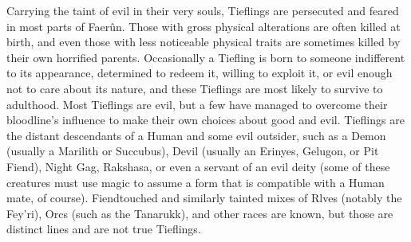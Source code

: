 
Carrying the taint of evil in their very souls, Tieflings are persecuted and feared in most parts of Faerûn. Those with gross physical alterations are often killed at birth, and even those with less noticeable physical traits are sometimes killed by their own horrified parents. Occasionally a Tiefling is born to someone indifferent to its appearance, determined to redeem it, willing to exploit it, or evil enough not to care about its nature, and these Tieflings are most likely to survive to adulthood. Most Tieflings are evil, but a few have managed to overcome their bloodline’s influence to make their own choices about good and evil. Tieflings are the distant descendants of a Human and some evil outsider, such as a Demon (usually a Marilith or Succubus), Devil (usually an Erinyes, Gelugon, or Pit Fiend), Night Gag, Rakshasa, or even a servant of an evil deity (some of these creatures must use magic to assume a form that is compatible with a Human mate, of course). Fiendtouched and similarly tainted mixes of Rlves (notably the Fey’ri), Orcs (such as the Tanarukk), and other races are known, but those are distinct lines and are not true Tieflings.

